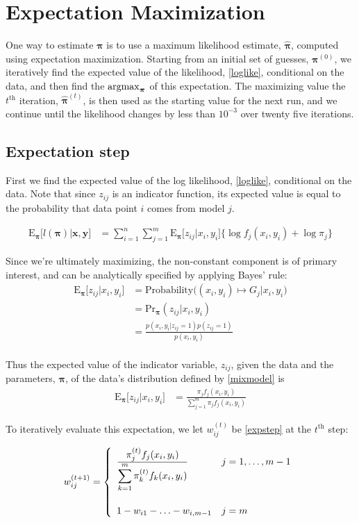 \documentclass[12pt]{amsart}
\newcommand{\vect}[1]{\boldsymbol{\mathbf{#1}}}
\newcommand{\eqn}[1]{\begin{align*}
#1
\end{align*}}
\newcommand{\eqnl}[2]{\begin{align} \label{#1}
#2
\end{align}}
\newcommand{\bl}{\big\{}
\newcommand{\br}{\big\}}
\newcommand{\argmax}{\operatornamewithlimits{argmax}}
\newcommand{\eqnset}[4]{
\[ #1 = #2 \left\{ \begin{array}{#3}
        #4
\end{array} \right. \] 
}
\newcommand{\vx}{\vect{x}}
\newcommand{\vy}{\vect{y}}
\newcommand{\vp}{\vect{\pi}}
\newcommand{\vph}{\hat{\vect{\pi}}}
\newcommand{\fab}{f_j}
\newcommand{\llp}{l(\vect{\pi})}
\newcommand{\sumn}{\sum^n_{i=1}}
\newcommand{\summ}{\sum^m_{j=1}}
\newcommand{\sumk}{\sum^m_{k=1}}
\begin{document}
\section{Expectation Maximization}

One way to estimate $\vp$ is to use a maximum likelihood estimate, $\vph$, computed using expectation maximization. Starting from an initial set of guesses, $\vp^{(0)}$, we iteratively find the expected value of the likelihood, \eqref{loglike}, conditional on the data, and then find the $\argmax_{\vp}$ of this expectation. The maximizing value the $t^\text{th}$ iteration, $\vph^{(t)}$, is then used as the starting value for the next run, and we continue until the likelihood changes by less than $10^{-3}$ over twenty five iterations.

\subsection{Expectation step}
First we find the expected value of the log likelihood, \eqref{loglike}, conditional on the data. Note that since $z_{ij}$ is an indicator function, its expected value is equal to the probability that data point $i$ comes from model $j$.

\eqn{
	\text{E}_{\vp}\Big[\llp \big| \vx,\vy \Big] &= \sumn \summ \text{E}_{\vp}\big[z_{ij}|x_i,y_i\big] \bl \log \fab(x_i,y_i) + \log \pi_j  \br
}

Since we're ultimately maximizing, the non-constant component is of primary interest, and can be analytically specified by applying Bayes' rule:
\eqn{
	\text{E}_{\vp}\Big[  z_{ij} | x_i, y_i \Big] &= \text{Probability}\Big((x_i,y_i) \mapsto G_j \big | x_i,y_i\Big)	\\
	&= \text{Pr}_{\vp}(z_{ij}|x_i,y_i)	\\
	&= \frac{p(x_i,y_i|z_{ij}=1)p(z_{ij}=1)}{p(x_i,y_i)}	\\
}

Thus the expected value of the indicator variable, $z_{ij}$, given the data and the parameters, $\vp$, of the data's distribution defined by \eqref{mixmodel} is
\eqnl{expstep}{
	\text{E}_{\vp}\Big[  z_{ij} | x_i, y_i \Big] &=  \frac{\pi_j \fab(x_i,y_i)  }{\summ \pi_j \fab(x_i,y_i)}
}

To iteratively evaluate this expectation, we let $w^{(t)}_{ij}$ be \eqref{expstep} at the $t^\text{th}$ step:
\eqnset{w^{(t+1)}_{ij}}{}{ll}{
	\frac{\displaystyle\pi^{(t)}_{j} \fab(x_i,y_i)}{\displaystyle\sumk \pi^{(t)}_{k}f_k(x_i,y_i)}				& j=1,\ldots,m-1	\\
	\vspace{1mm} & \\
	1 - w_{i1} - \ldots - w_{i,m-1}		& j=m
}
\end{document}
